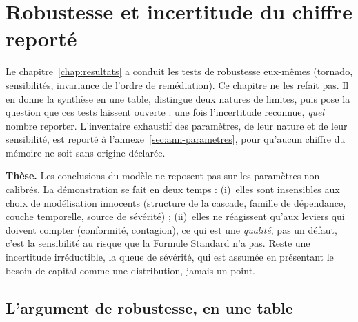 \chapter{Robustesse et incertitude du chiffre reporté}
\label{ch:robustesse}

\noindent Le chapitre~\ref{chap:resultats} a conduit les tests de robustesse eux-mêmes
(tornado, sensibilités, invariance de l'ordre de remédiation). Ce chapitre ne les refait pas.
Il en donne la synthèse en une table, distingue deux natures de limites, puis pose la
question que ces tests laissent ouverte : une fois l'incertitude reconnue, \emph{quel} nombre
reporter. L'inventaire exhaustif des
paramètres, de leur nature et de leur sensibilité, est reporté à
l'annexe~\ref{sec:ann-parametres}, pour qu'aucun chiffre du mémoire ne soit sans origine
déclarée.

\begin{cle}
\textbf{Thèse.} Les conclusions du modèle ne reposent pas sur les paramètres non calibrés.
La démonstration se fait en deux temps : (i)~elles sont insensibles aux choix de modélisation
innocents (structure de la cascade, famille de dépendance, couche temporelle, source de
sévérité) ; (ii)~elles ne réagissent qu'aux leviers qui doivent compter (conformité,
contagion), ce qui est une \emph{qualité}, pas un défaut, c'est la sensibilité au risque que
la Formule Standard n'a pas. Reste une incertitude irréductible, la queue de sévérité, qui est
assumée en présentant le besoin de capital comme une distribution, jamais un point.
\end{cle}

\section{L'argument de robustesse, en une table}

